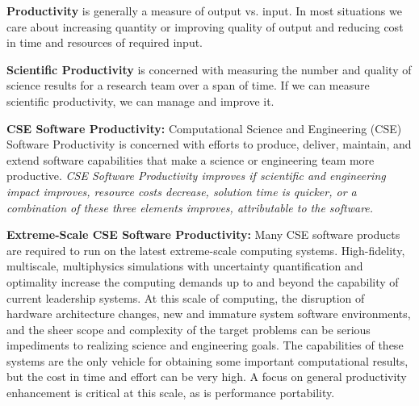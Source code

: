 \documentclass[]{article}
\date{}
\begin{document}
\pagestyle{fancy}
\renewcommand{\headrulewidth}{0pt}
  
\thispagestyle{empty}
\textbf{\newline}
\textbf{\newline}

\textbf{Productivity} is generally a measure of output vs. input. In
most situations we care about increasing quantity or improving quality
of output and reducing cost in time and resources of required input.

\textbf{Scientific Productivity} is concerned with measuring the number
and quality of science results for a research team over a span of time.
If we can measure scientific productivity, we can manage and improve it.

\textbf{CSE Software Productivity:} Computational Science and
Engineering (CSE) Software Productivity is concerned with efforts to
produce, deliver, maintain, and extend software capabilities that make a
science or engineering team more productive. \emph{CSE Software
Productivity improves if scientific and engineering impact improves,
resource costs decrease, solution time is quicker, or a combination of
these three elements improves, attributable to the software.}

\textbf{Extreme-Scale CSE Software Productivity:} Many CSE software
products are required to run on the latest extreme-scale computing
systems. High-fidelity, multiscale, multiphysics simulations with
uncertainty quantification and optimality increase the computing demands
up to and beyond the capability of current leadership systems. At this
scale of computing, the disruption of hardware architecture changes, new
and immature system software environments, and the sheer scope and
complexity of the target problems can be serious impediments to
realizing science and engineering goals. The capabilities of these
systems are the only vehicle for obtaining some important computational
results, but the cost in time and effort can be very high. A focus on
general productivity enhancement is critical at this scale, as is
performance portability.
\end{document}
